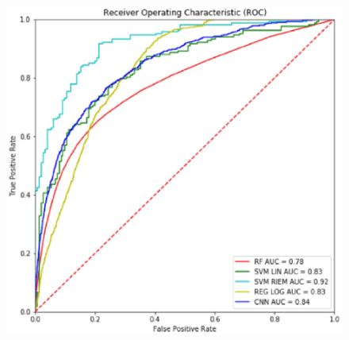 \documentclass[a4paper,11pt]{report}
\begin{document}
\begin{figure}[!h]
\begin{center}
  \includegraphics[width=.7\textwidth]{imgs/auc.eps}
  \end{center}
\end{figure}


\newpage



\end{document}

